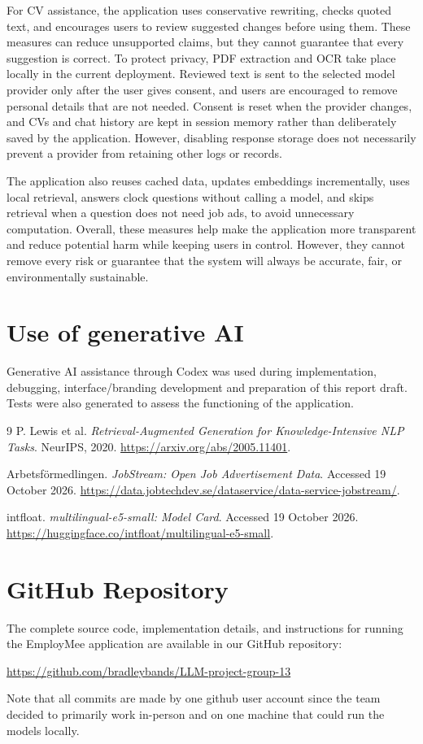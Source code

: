 \documentclass[a4paper,10pt]{article}
\begin{document}
For CV assistance, the application uses conservative rewriting, checks quoted text, and encourages users to review suggested changes before using them. These measures can reduce unsupported claims, but they cannot guarantee that every suggestion is correct. To protect privacy, PDF extraction and OCR take place locally in the current deployment. Reviewed text is sent to the selected model provider only after the user gives consent, and users are encouraged to remove personal details that are not needed. Consent is reset when the provider changes, and CVs and chat history are kept in session memory rather than deliberately saved by the application. However, disabling response storage does not necessarily prevent a provider from retaining other logs or records.

The application also reuses cached data, updates embeddings incrementally, uses local retrieval, answers clock questions without calling a model, and skips retrieval when a question does not need job ads, to avoid unnecessary computation. Overall, these measures help make the application more transparent and reduce potential harm while keeping users in control. However, they cannot remove every risk or guarantee that the system will always be accurate, fair, or environmentally sustainable.

\section*{Use of generative AI}
Generative AI assistance through Codex was used during implementation, debugging, interface/branding development and preparation of this report draft. Tests were also generated to assess the functioning of the application. 

\begin{thebibliography}{9}
 P. Lewis et al. \textit{Retrieval-Augmented Generation for Knowledge-Intensive NLP Tasks}. NeurIPS, 2020. \url{https://arxiv.org/abs/2005.11401}.

 Arbetsf\"ormedlingen. \textit{JobStream: Open Job Advertisement Data}. Accessed 19 October 2026. \url{https://data.jobtechdev.se/dataservice/data-service-jobstream/}.

 intfloat. \textit{multilingual-e5-small: Model Card}. Accessed 19 October 2026. \url{https://huggingface.co/intfloat/multilingual-e5-small}.

\end{thebibliography}
	
	
\pagebreak

\appendix
\section{GitHub Repository}

The complete source code, implementation details, and instructions for running the EmployMee application are available in our GitHub repository:

    \url{https://github.com/bradleybands/LLM-project-group-13}

Note that all commits are made by one github user account since the team decided to primarily work in-person and on one machine that could run the models locally.
\end{document}
